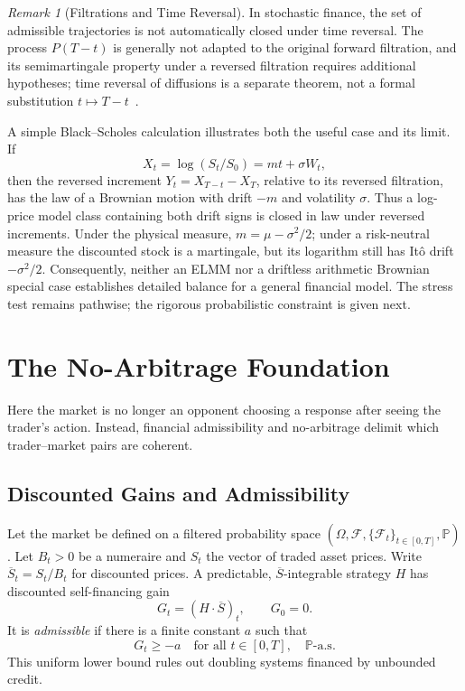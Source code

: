 \documentclass[aps,pra,reprint,superscriptaddress,amsmath,amssymb,floatfix]{revtex4-2}
\theoremstyle{plain}
\theoremstyle{definition}
\theoremstyle{remark}
\newtheorem{remark}{Remark}
\begin{document}
\begin{remark}[Filtrations and Time Reversal]
In stochastic finance, the set of admissible trajectories is not automatically
closed under time reversal. The process \(P(T-t)\) is generally not adapted to
the original forward filtration, and its semimartingale property under a
reversed filtration requires additional hypotheses; time reversal of
diffusions is a separate theorem, not a formal substitution
\(t\mapsto T-t\)~\cite{HaussmannPardoux1986}.

A simple Black--Scholes calculation illustrates both the useful case and its
limit. If
\[
  X_t=\log(S_t/S_0)=mt+\sigma W_t,
\]
then the reversed increment \(Y_t=X_{T-t}-X_T\), relative to its reversed
filtration, has the law of a Brownian motion with drift \(-m\) and volatility
\(\sigma\). Thus a log-price model class containing both drift signs is closed
in law under reversed increments. Under the physical measure,
\(m=\mu-\sigma^2/2\); under a risk-neutral measure the discounted stock is a
martingale, but its logarithm still has It\^o drift \(-\sigma^2/2\).
Consequently, neither an ELMM nor a driftless arithmetic Brownian special case
establishes detailed balance for a general financial model. The stress test
remains pathwise; the rigorous probabilistic constraint is given next.
\end{remark}

\section{The No-Arbitrage Foundation}
\label{sec:noarb}

Here the market is no longer an opponent choosing a response after seeing the
trader's action. Instead, financial admissibility and no-arbitrage delimit
which trader--market pairs are coherent.

\subsection{Discounted Gains and Admissibility}

Let the market be defined on a filtered probability space
\((\Omega,\mathcal{F},\{\mathcal{F}_t\}_{t\in[0,T]},\mathbb{P})\).
Let \(B_t>0\) be a numeraire and \(S_t\) the vector of traded asset prices.
Write \(\overline S_t=S_t/B_t\) for discounted prices. A predictable,
\(\overline S\)-integrable strategy \(H\) has discounted self-financing gain
\begin{equation}
  G_t=(H\mathbin{\cdot}\overline S)_t,\qquad G_0=0.
  \label{eq:gain}
\end{equation}
It is \emph{admissible} if there is a finite constant \(a\) such that
\begin{equation}
  G_t\geq -a\quad\text{for all }t\in[0,T],\quad\mathbb{P}\text{-a.s.}
  \label{eq:admissible}
\end{equation}
This uniform lower bound rules out doubling systems financed by unbounded
credit.
\end{document}
